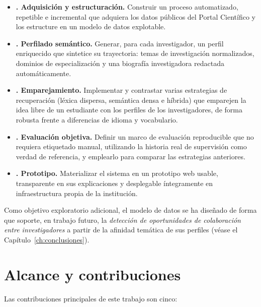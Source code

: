 \begin{itemize}
    \item \textbf{. Adquisición y estructuración.} Construir un proceso automatizado, repetible e incremental que adquiera los datos públicos del Portal Científico y los estructure en un modelo de datos explotable.
    \item \textbf{. Perfilado semántico.} Generar, para cada investigador, un perfil enriquecido que sintetice su trayectoria: temas de investigación normalizados, dominios de especialización y una biografía investigadora redactada automáticamente.
    \item \textbf{. Emparejamiento.} Implementar y contrastar varias estrategias de recuperación (léxica dispersa, semántica densa e híbrida) que emparejen la idea libre de un estudiante con los perfiles de los investigadores, de forma robusta frente a diferencias de idioma y vocabulario.
    \item \textbf{. Evaluación objetiva.} Definir un marco de evaluación reproducible que no requiera etiquetado manual, utilizando la historia real de supervisión como verdad de referencia, y emplearlo para comparar las estrategias anteriores.
    \item \textbf{. Prototipo.} Materializar el sistema en un prototipo web usable, transparente en sus explicaciones y desplegable íntegramente en infraestructura propia de la institución.
\end{itemize}

Como objetivo exploratorio adicional, el modelo de datos se ha diseñado de forma que soporte, en trabajo futuro, la \emph{detección de oportunidades de colaboración entre investigadores} a partir de la afinidad temática de sus perfiles (véase el Capítulo~\ref{ch:conclusiones}).

\section{Alcance y contribuciones}
\label{sec:contribuciones}

Las contribuciones principales de este trabajo son cinco:

